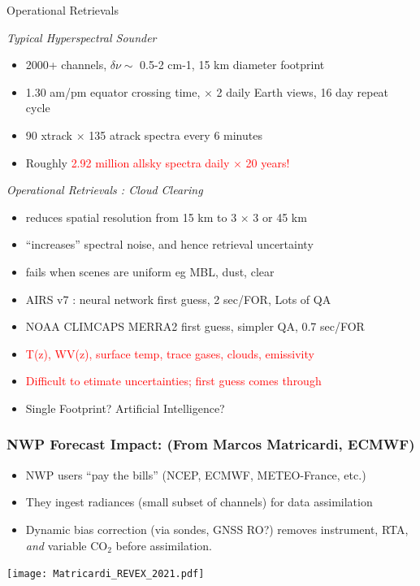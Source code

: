 \documentclass[10pt,t]{beamer}
\begin{document}
\begin{frame}[shrink=2]{Operational Retrievals}
\vspace{-0.11in}

\emph{Typical Hyperspectral Sounder}
\vspace{-0.1in}
\begin{itemize}
  \item 2000+ channels, $\delta \nu \sim$ 0.5-2 cm-1, 15 km diameter footprint
  \item 1.30 am/pm equator crossing time, $\times$ 2 daily Earth views, 16 day repeat cycle
  \item 90 xtrack $\times$ 135 atrack spectra every 6 minutes
  \item Roughly \textcolor{red}{2.92 million  allsky spectra daily $\times$ 20 years!}
\end{itemize}

\vspace{0.10in}

\emph{Operational Retrievals : Cloud Clearing}
\vspace{-0.1in}
\begin{itemize}
  \item reduces spatial resolution from 15 km to 3 $\times$ 3 or 45 km
  \item ``increases'' spectral noise, and hence retrieval uncertainty
  \item fails when scenes are uniform eg MBL, dust, clear
  \item AIRS v7 : neural network first guess, 2 sec/FOR, Lots of QA
  \item NOAA CLIMCAPS MERRA2 first guess, simpler QA, 0.7 sec/FOR
  \item \textcolor{red}{T(z), WV(z), surface temp, trace gases, clouds, emissivity}
  \item \textcolor{red}{Difficult to etimate uncertainties; first guess comes through}
  \item Single Footprint? Artificial Intelligence?
\end{itemize}

\end{frame}
\begin{frame}
  \frametitle{NWP Forecast Impact: \small (From Marcos Matricardi, ECMWF)}
  \vspace{-0.1in}
  \begin{small}
  \begin{itemize}
  \item NWP users ``pay the bills'' (NCEP, ECMWF, METEO-France, etc.)
  \item They ingest radiances (small subset of channels) for data assimilation
  \item Dynamic bias correction (via sondes, GNSS RO?) removes instrument, RTA, \textit{and} variable CO$_2$ before assimilation.
\end{itemize}
  \end{small}
  \vspace{-0.45in}
  \texttt{[image: Matricardi\_REVEX\_2021.pdf]}
\end{frame}
\end{document}
